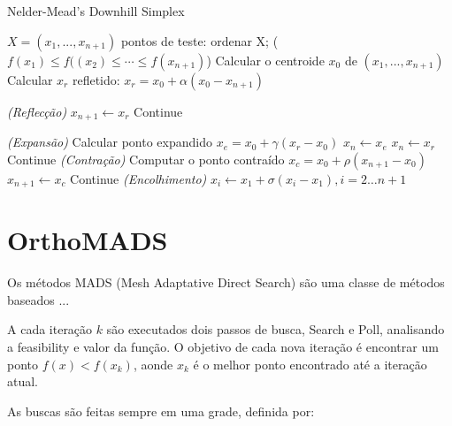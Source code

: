 \begin{algorithm}
    \caption{Nelder-Mead's Downhill Simplex}
    \label{alg:nm}
    \begin{algorithmic}[1] %
        \Require $X = (x_1, ... , x_{n+1})$ pontos de teste:
                \State ordenar X; ($f(x _1) \leq f(({x} _2) \leq \cdots \leq f(x_{n+1})$) 
                \State Calcular o centroide $x_0$ de $(x_{1}, ... , x_{n+1})$
                \State Calcular $x_r$ refletido: $x_r = x_0 + \alpha(x_0 - x_{n+1})$ 
                
\BState \emph{(Reflecção)}                
                    \State $x_{n+1} \gets x_r$
                    \State Continue
                \EndIf

\BState \emph{(Expansão)}
                    \State Calcular ponto expandido $x_e = x_0 + \gamma(x_r - x_0) $
                        \State $x_n \gets x_e$
                    \Else
                        \State $x_n \gets x_r$                  
                    \EndIf
                    \State Continue
                \EndIf
\BState \emph{(Contração)}
                \State Computar o ponto contraído $x_c = x_0 + \rho(x_{n+1} - x_0)$
                    \State $x_{n+1} \gets x_c$
                    \State Continue             
                \EndIf
\BState \emph{(Encolhimento)}
                \State $x_i \gets x_1 + \sigma(x_i - x_1), i=2 \dots n+1$
            \EndWhile
    \end{algorithmic}
\end{algorithm}



\section{OrthoMADS}

Os métodos MADS (Mesh Adaptative Direct Search) são uma classe de métodos baseados ...


A cada iteração $ k $ são executados dois passos de busca, Search e Poll, analisando a feasibility e valor da função. O objetivo de cada nova iteração é encontrar um ponto $f(x) < f(x_k)$, aonde $x_k$ é o melhor ponto encontrado até a iteração atual. 

As buscas são feitas sempre em uma grade, definida por:


